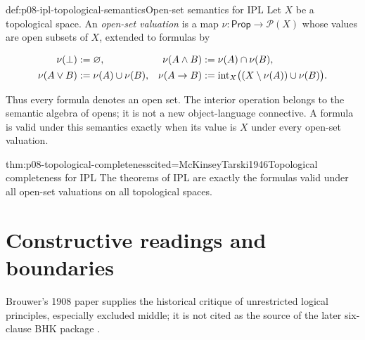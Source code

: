 \begin{hbdefinition}{def:p08-ipl-topological-semantics}{Open-set semantics for IPL}
Let \(X\) be a topological space.  An \emph{open-set valuation} is a map
\(\nu:\mathsf{Prop}\to\mathcal P(X)\) whose values are open subsets of
\(X\), extended to formulas by

\[
\begin{aligned}
 \nu(\bot)&\mathrel{:=}\varnothing,
 &\nu(A\land B)&\mathrel{:=}\nu(A)\cap\nu(B),\\
 \nu(A\lor B)&\mathrel{:=}\nu(A)\cup\nu(B),
 &\nu(A\to B)&\mathrel{:=}
   \operatorname{int}_{X}
   \bigl((X\setminus\nu(A))\cup\nu(B)\bigr).
\end{aligned}
\]

Thus every formula denotes an open set.  The interior operation belongs to the
semantic algebra of opens; it is not a new object-language connective.  A
formula is valid under this semantics exactly when its value is \(X\) under
every open-set valuation.
\end{hbdefinition}

\begin{hbtheorem}{thm:p08-topological-completeness}{cited=McKinseyTarski1946}{Topological completeness for IPL}
The theorems of IPL are exactly the formulas valid under all open-set
valuations on all topological spaces.
\end{hbtheorem}

\section{Constructive readings and boundaries}

Brouwer's 1908 paper supplies the historical critique of unrestricted logical
principles, especially excluded middle; it is not cited as the source of the
later six-clause BHK package \cite{Brouwer1908}.

